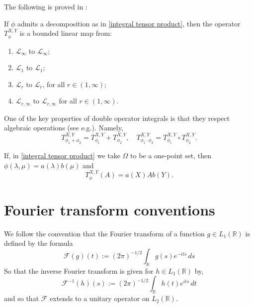     The following is proved in \cite[Theorem 4]{PS-crelle}:
    \begin{thm}
        If $\phi$ admits a decomposition as in \eqref{integral tensor product}, then the operator $T_{\phi}^{X,Y}$ is a bounded linear map from:
        \begin{enumerate}[{\rm (a)}]
            \item{} $\mathcal{L}_{\infty}$ to $\mathcal{L}_{\infty}$;
            \item{} $\mathcal{L}_{1}$ to $\mathcal{L}_{1}$;
            \item{} $\mathcal{L}_{r}$ to $\mathcal{L}_r$, for all $r \in (1,\infty)$;
            \item{} $\mathcal{L}_{r,\infty}$ to $\mathcal{L}_{r,\infty}$ for all $r \in (1,\infty)$.
        \end{enumerate}
    \end{thm}

    One of the key properties of double operator integrals is that they respect algebraic operations (see e.g.\cite[Proposition 2.8]{PSW}). Namely,
    \begin{equation}\label{doi algebraic}
        T_{\phi_1+\phi_2}^{X,Y}=T_{\phi_1}^{X,Y}+T_{\phi_2}^{X,Y},\quad T_{\phi_1\cdot \phi_2}^{X,Y}=T_{\phi_1}^{X,Y}\circ T_{\phi_2}^{X,Y}.
    \end{equation}

    If, in \eqref{integral tensor product} we take $\Omega$ to be a one-point set, then $\phi(\lambda,\mu) = a(\lambda)b(\mu)$ and
    \begin{equation}\label{separated variables in doi}
        T_{\phi}^{X,Y}(A)=a(X)Ab(Y).
    \end{equation}

\section{Fourier transform conventions}

    We follow the convention that the Fourier transform of a function $g \in L_1(\mathbb{R})$ is defined by the formula
    \begin{equation*}
        \mathcal{F}(g)(t) := (2\pi)^{-1/2}\int_{\mathbb{R}} g(s)e^{-its}\,ds
    \end{equation*}
    So that the inverse Fourier transform is given for $h \in L_1(\mathbb{R})$ by,
    \begin{equation*}
        \mathcal{F}^{-1}(h)(s) := (2\pi)^{-1/2}\int_{\mathbb{R}} h(t)e^{its}\,dt
    \end{equation*}
    and so that $\mathcal{F}$ extends to a unitary operator on $L_2(\mathbb{R})$.
    
